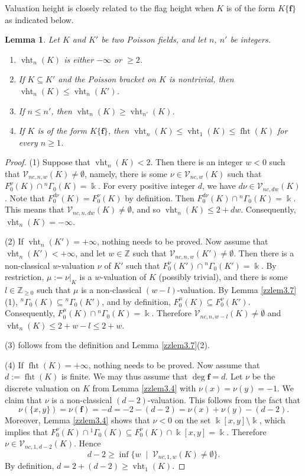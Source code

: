 \documentclass[12pt]{amsart}
\theoremstyle{plain}
\newtheorem{lemma}[theorem]{Lemma}
\numberwithin{theorem}{section}
\numberwithin{equation}{theorem}
\theoremstyle{definition}
\newcommand{\ZZ}{\mathbb{Z}}
\DeclareMathOperator{\fht}{fht}
\DeclareMathOperator{\vht}{vht}
\newcommand \bff {{\mathbf{f}}}
\newcommand \calV {{\mathcal{V}}}
\newcommand \Znn {\ZZ_{\ge 0}}
\begin{document}
Valuation height is closely related to 
the flag height when $K$ is of the 
form $K\{\bff\}$ as indicated below.

\begin{lemma}
\label{zzlem3.14}
Let $K$ and $K'$ be two Poisson fields, 
and let $n$, $n'$ be integers.
\begin{enumerate}
\item[(1)]
$\vht_n(K)$ is either $-\infty$ or $\geq 2$.
\item[(2)]
If $K\subseteq K'$ and the Poisson bracket on $K$ is nontrivial, then $\vht_n(K)\leq \vht_n(K')$.
\item[(3)]
If $n\leq n'$, then $\vht_n(K)\geq \vht_{n'}(K)$.
\item[(4)]
If $K$ is of the form $K\{\bff\}$, then 
$\vht_n(K)\leq \vht_1(K)\leq \fht(K)$
for every $n\geq 1$.
\end{enumerate}
\end{lemma}

\begin{proof}
(1) Suppose that $\vht_n(K)<2$. Then there is an integer $w<0$ 
such that ${\mathcal V}_{nc,n,w}(K)\neq \emptyset$, namely,
there is some $\nu\in {\mathcal V}_{nc,w}(K)$ such that 
$F^{\nu}_0(K) \cap {^n\Gamma}_{0}(K) = \Bbbk$. For every 
positive integer $d$, we have $d\nu \in {\mathcal V}_{nc,dw}(K)$.
Note that $F^{d\nu}_0(K)=F^{\nu}_0(K)$ by definition. Then
$F^{d\nu}_0(K) \cap {^n\Gamma}_{0}(K) = \Bbbk$. This means
that ${\mathcal V}_{nc,n,dw}(K)\neq \emptyset$, and so $\vht_n(K) \le 2+dw$.  Consequently, $\vht_n(K)=-\infty$. 

(2) If $\vht_n(K')=+\infty$, nothing needs to be proved. Now assume 
that $\vht_n(K') < +\infty$, and let $w \in \ZZ$ such that $\calV_{nc,n,w}(K') \ne \emptyset$. Then there is a non-classical 
$w$-valuation $\nu$ of $K'$ such that 
$F^{\nu}_0(K') \cap {^n\Gamma}_{0}(K') = \Bbbk$. By restriction,
$\mu:=\nu|_{K}$ is a $w$-valuation 
of $K$ (possibly trivial), and there is some $l \in \Znn$ such that $\mu$ is a non-classical $(w-l)$-valuation. By Lemma \ref{zzlem3.7}(1), ${^n\Gamma}_0(K)
\subseteq {^n\Gamma}_0(K')$, and by definition, $F^{\mu}_0(K)
\subseteq F^{\nu}_0(K')$. Consequently, $F^{\mu}_0(K)\cap 
{^n\Gamma}_{0}(K) = \Bbbk$. Therefore ${\mathcal V}_{nc,n,w-l}(K) \neq \emptyset$ and $\vht_n(K) \le 2+w-l \leq 2+w$. 

(3) follows from the definition and Lemma \ref{zzlem3.7}(2). 

(4) If $\fht(K)=+\infty$, nothing needs to be proved.
Now assume that $d:=\fht(K)$ is finite.  We may thus assume that $\deg \bff = d$.  Let $\nu$ be the discrete valuation on $K$ from Lemma \ref{zzlem3.4} with $\nu(x) = \nu(y) = -1$.  We claim that $\nu$ is a non-classical $(d-2)$-valuation.
This follows from the fact that
$$\nu(\{x,y\})=\nu(\bff)=-d= -2-(d-2) =\nu(x)+\nu(y)-(d-2).$$
Moreover, Lemma \ref{zzlem3.4} shows 
that $\nu < 0$ on the set $\Bbbk[x,y] 
\setminus \Bbbk$, which implies that $F^{\nu}_0(K)\cap {^1\Gamma}_{0}(K)
\subseteq F^{\nu}_0(K) \cap 
\Bbbk[x,y]=\Bbbk$. Therefore 
$\nu\in {\mathcal V}_{nc, 1,d-2}(K)$. 
Hence
$$d-2\geq \inf\{ w \; \mid \; 
{\mathcal V}_{nc, 1,w}(K)
\neq \emptyset\}.$$
By definition, $d=2+(d-2) \geq \vht_1(K)$.
\end{proof}
\end{document}
